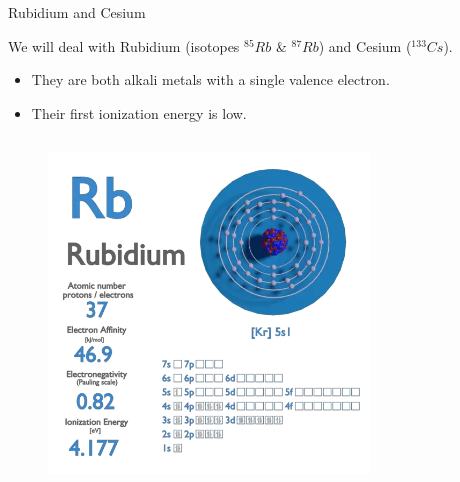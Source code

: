 \begin{frame}{Rubidium and Cesium}

    We will deal with Rubidium (isotopes $^{85}Rb$ \& $^{87}Rb$) and Cesium ($^{133}Cs$).

    \begin{itemize}
        \item They are both alkali metals with a single valence electron.
        \item Their first ionization energy is low.
    \end{itemize}

    \begin{columns}[c, onlytextwidth]

        \begin{column}{0.5\textwidth}

            \begin{figure}
                \centering
                \includegraphics[width=0.8\textwidth]{img/data-Rubidium.png}
            \end{figure}

        \end{column}

        \begin{column}{0.5\textwidth}


\end{column}
\end{columns}
\end{frame}
